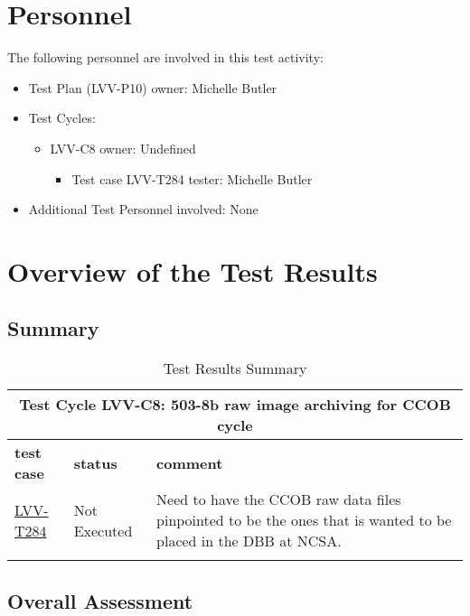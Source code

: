 \documentclass[DM,lsstdraft,STR,toc]{lsstdoc}
\begin{document}
\section{Personnel}
\label{sect:personnel}

The following personnel are involved in this test activity:

\begin{itemize}
\item Test Plan (LVV-P10) owner: Michelle Butler
\item Test Cycles:
\begin{itemize}
  \item LVV-C8 owner: 
    Undefined
  \begin{itemize}
    \item Test case LVV-T284 tester: Michelle Butler
  \end{itemize}
\end{itemize}
\item Additional Test Personnel involved: None
\end{itemize}

\newpage

\section{Overview of the Test Results}
\label{sect:overview}

\subsection{Summary}
\label{sect:summarytable}

\begin{longtable} {p{}p{}p{}}
\toprule
  \multicolumn{3}{c}{ Test Cycle {\bf LVV-C8: 503-8b raw image archiving for CCOB cycle }} \\\hline
  {\bf \footnotesize test case} & {\bf \footnotesize status} & {\bf \footnotesize comment} \\\toprule
    \href{https://jira.lsstcorp.org/secure/Tests.jspa#/testCase/LVV-T284}{LVV-T284} 
    & Not Executed & Need to have the CCOB raw data files pinpointed to be the ones that is
wanted to be placed in the DBB at NCSA.~~

    \\\hline

\caption{Test Results Summary}
\label{table:summary}
\end{longtable}

\subsection{Overall Assessment}
\label{sect:overallassessment}
\end{document}
